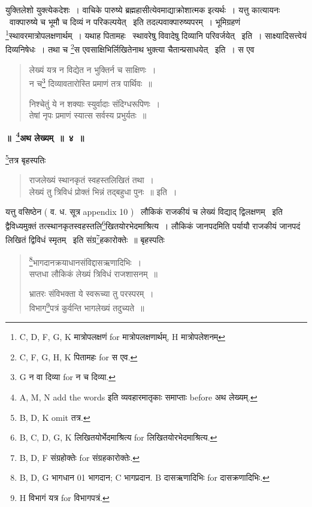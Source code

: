 \documentclass[11pt, openany]{book}
\begin{document}
युक्तिलेशो युक्त्येकदेशः~। वाचिके पारुष्ये ब्रह्महासीत्येवमाद्याक्रोशात्मक इत्यर्थः~। यत्तु कात्यायनः \textendash\ वाक्पारुष्ये च भूमौ च दिव्यं न परिकल्पयेत् \textendash\ इति तदल्पवाक्पारुष्यपरम्~। भूमिग्रहणं \renewcommand{\thefootnote}{5}\footnote{C, D, F, G, K मात्रोपलक्षणं for मात्रोपलक्षणार्थम्, H मात्रोपलेशनम्}स्थावरमात्रोपलक्षणार्थम्~। यथाह पितामहः \textendash\ स्थावरेषु विवादेषु दिव्यानि परिवर्जयेत् \textendash\ इति~। साक्ष्यादिसत्त्वेयं दिव्यनिषेधः~। तथा च \renewcommand{\thefootnote}{6}\footnote{C, F, G, H, K पितामहः for स एव.}स एवसाक्षिभिर्लिखितेनाथ भुक्त्या चैतान्प्रसाधयेत् \textendash\ इति~। स एव

\newpage
{}

\begin{quote}
{\vy लेख्यं यत्र न विद्येत न भुक्तिर्न च साक्षिणः~।\\
न च\renewcommand{\thefootnote}{1}\footnote{G न वा दिव्या for न च दिव्या.} दिव्यावतारोस्ति प्रमाणं तत्र पार्थिवः~॥

निश्चेतुं ये न शक्याः स्युर्वादाः संदिग्धरूपिणः~।\\
तेषां नृपः प्रमाणं स्यात्स सर्वस्य प्रभुर्यतः~॥}
\end{quote}

\begin{center}
\textbf{\Large ॥~\renewcommand{\thefootnote}{2}\footnote{A, M, N add the words इति व्यवहारमातृकाः समाप्ताः before अथ लेख्यम्.}अथ लेख्यम्~॥~४~॥}
\end{center}

\renewcommand{\thefootnote}{3}\footnote{B, D, K omit तत्र.}तत्र बृहस्पतिः

\begin{quote}
{\vy राजलेख्यं स्थानकृतं स्वहस्तलिखितं तथा~।\\
लेख्यं तु त्रिविधं प्रोक्तं भिन्नं तद्बहुधा पुनः~॥} इति~।
\end{quote}

यत्तु वसिष्ठेन ( व. ध. सूत्र appendix 10 ) \textendash\ लौकिकं राजकीयं च लेख्यं विद्याद् द्विलक्षणम् \textendash\ इति द्वैविध्यमुक्तं तत्स्थानकृतस्वहस्तलि\renewcommand{\thefootnote}{4}\footnote{B, C, D, G, K लिखितयोर्भेदमाश्रित्य for लिखितयोरभेदमाश्रित्य.}खितयोरभेदमाश्रित्य~। लौकिकं जानपदमिति पर्यायौ राजकीयं जानपदं लिखितं द्विविधं स्मृतम् \textendash\ इति संग्र\renewcommand{\thefootnote}{5}\footnote{B, D, F संग्रहोक्तेः for संग्रहकारोक्तेः.}हकारोक्तेः~॥ बृहस्पतिः

\begin{quote}
{\vy \renewcommand{\thefootnote}{6}\footnote{B, D, G भागधान 01 भागदान; C भागप्रदान. B दासऋणादिभिः for दासक्रणादिभिः.}भागदानक्रयाधानसंविद्दासऋणादिभिः~।\\
सप्तधा लौकिकं लेख्यं त्रिविधं राजशासनम्~॥

भ्रातरः संविभक्ता ये स्वरूच्या तु परस्परम्~।\\
विभाग\renewcommand{\thefootnote}{7}\footnote{H विभागं यत्र for विभागपत्रं.}पत्रं कुर्वन्ति भागलेख्यं तदुच्यते~॥}
\end{quote}
\end{document}
